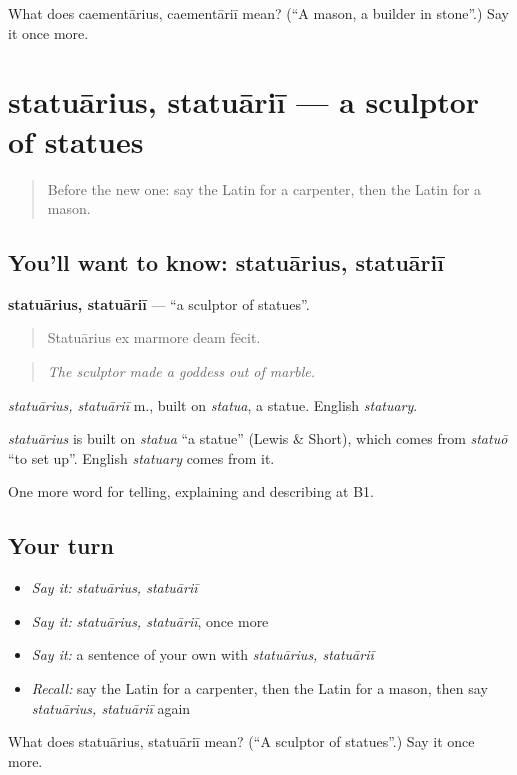\begin{tcolorbox}[breakable,colback=teal!4,colframe=teal!35!black,title={Before you move on}]
What does caementārius, caementāriī mean? (\textquotedblleft{}A mason, a builder in stone\textquotedblright{}.) Say it once more.
\end{tcolorbox}
\section[statuārius, statuāriī]{statuārius, statuāriī — a sculptor of statues}

\label{lesson:LA-C377-statuarius}



\begin{quote}
Before the new one: say the Latin for a carpenter, then the Latin for a mason.
\end{quote}

\subsection*{You'll want to know: statuārius, statuāriī}
\textbf{statuārius, statuāriī} — \textquotedblleft{}a sculptor of statues\textquotedblright{}.

\begin{quote}
Statuārius ex marmore deam fēcit.
\end{quote}

\begin{quote}
\emph{The sculptor made a goddess out of marble.}
\end{quote}

\emph{statuārius, statuāriī} m., built on \emph{statua}, a statue. English \emph{statuary}.

\begin{cousinweb}
\emph{statuārius} is built on \emph{statua} \textquotedblleft{}a statue\textquotedblright{} (Lewis \& Short), which comes from \emph{statuō} \textquotedblleft{}to set up\textquotedblright{}. English \emph{statuary} comes from it.
\end{cousinweb}

\begin{grammarlens}[title={What you've built}]
One more word for telling, explaining and describing at B1.
\end{grammarlens}

\subsection*{Your turn}
\begin{itemize}
\raggedright
  \item \emph{Say it:} \emph{statuārius, statuāriī}
  \item \emph{Say it:} \emph{statuārius, statuāriī}, once more
  \item \emph{Say it:} a sentence of your own with \emph{statuārius, statuāriī}
  \item \emph{Recall:} say the Latin for a carpenter, then the Latin for a mason, then say \emph{statuārius, statuāriī} again
\end{itemize}

\begin{tcolorbox}[breakable,colback=teal!4,colframe=teal!35!black,title={Before you move on}]
What does statuārius, statuāriī mean? (\textquotedblleft{}A sculptor of statues\textquotedblright{}.) Say it once more.
\end{tcolorbox}
